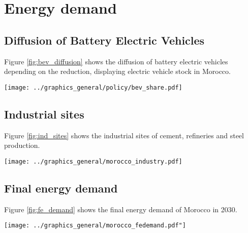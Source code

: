 

\section{Energy demand}

\subsection{Diffusion of Battery Electric Vehicles}
\label{subsec:bev_diffusion}
Figure \ref{fig:bev_diffusion} shows the diffusion of battery electric vehicles depending on the \co reduction, displaying electric vehicle stock in Morocco.

\begin{figure*}[h]
    \centering
    \texttt{[image: ../graphics\_general/policy/bev\_share.pdf]}
    \caption{Market diffusion of Battery Electricity Vehicles in Morocco, synthesized based on an s-curve with a growth rate $k=0.2$ and inflection point $x_0=2040$.}
    \label{fig:bev_diffusion}
\end{figure*}

\subsection{Industrial sites}

Figure \ref{fig:ind_sites} shows the industrial sites of cement, refineries and steel production.

\begin{figure*}[h]
    \centering
    \texttt{[image: ../graphics\_general/morocco\_industry.pdf]}
    \caption{Industrial sites in Morocco.}
    \label{fig:ind_sites}
\end{figure*}

\clearpage

\subsection{Final energy demand}

Figure \ref{fig:fe_demand} shows the final energy demand of Morocco in 2030.

\begin{figure*}[h]
    \centering
    \texttt{[image: ../graphics\_general/morocco\_fedemand.pdf"]}
    \caption{Final energy demand of Morocco in 2030 (TODO: NEEDS REVISION)}
    \label{fig:fe_demand}
\end{figure*}

\clearpage